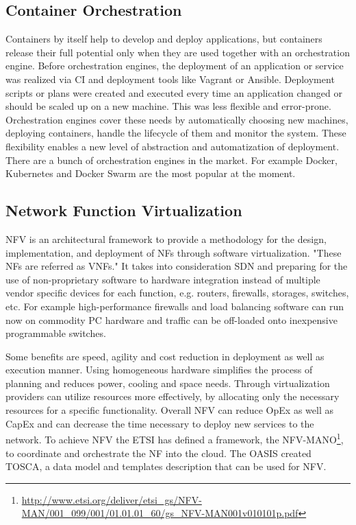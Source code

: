 \subsection{Container Orchestration}
Containers by itself help to develop and deploy applications, but containers release their full potential only when they are used together with an orchestration engine.
Before orchestration engines, the deployment of an application or service was realized via \ac{CI} and deployment tools like Vagrant or Ansible.
Deployment scripts or plans were created and executed every time an application changed or should be scaled up on a new machine.
This was less flexible and error-prone.
Orchestration engines cover these needs by automatically choosing new machines, deploying containers, handle the lifecycle of them and monitor the system.
These flexibility enables a new level of abstraction and automatization of deployment.
There are a bunch of orchestration engines in the market.
For example Docker, Kubernetes and Docker Swarm are the most popular at the moment.


\subsection{Network Function Virtualization}
\ac{NFV} is an architectural framework to provide a methodology for the design, implementation, and deployment of \acp{NF} through software virtualization.\autocite[cf.][p. 8]{ETSI:NFV:2013}\autocite[cf.]{Rivenes:2014}
"These \acp{NF} are referred as \acp{VNF}."\autocite[p. 8]{ETSI:NFV:2013}
It takes into consideration \ac{SDN} and preparing for the use of non-proprietary software to hardware integration instead of multiple vendor specific devices for each function, e.g. routers, firewalls, storages, switches, etc.\autocite[cf.]{Rivenes:2014}
For example high-performance firewalls and load balancing software can run now on commodity PC hardware and traffic can be off-loaded onto inexpensive programmable switches.\autocite[cf.]{Noble:2015}

Some benefits are speed, agility and cost reduction in deployment as well as execution manner.\autocite[cf.]{Noble:2015}
Using homogeneous hardware simplifies the process of planning and reduces power, cooling and space needs.\autocite[cf.]{Noble:2015}
Through virtualization providers can utilize resources more effectively, by allocating only the necessary resources for a specific functionality.\autocite[cf.]{Noble:2015}
Overall \ac{NFV} can reduce \ac{OpEx} as well as \ac{CapEx} and can decrease the time necessary to deploy new services to the network.\autocite[cf.]{Noble:2015}
To achieve \ac{NFV} the \ac{ETSI} has defined a framework, the \ac{NFV-MANO}\footnote{\url{http://www.etsi.org/deliver/etsi_gs/NFV-MAN/001_099/001/01.01.01_60/gs_NFV-MAN001v010101p.pdf}}, to coordinate and orchestrate the \ac{NF} into the cloud.
The \ac{OASIS} created \ac{TOSCA}, a data model and templates description that can be used for \ac{NFV}.

